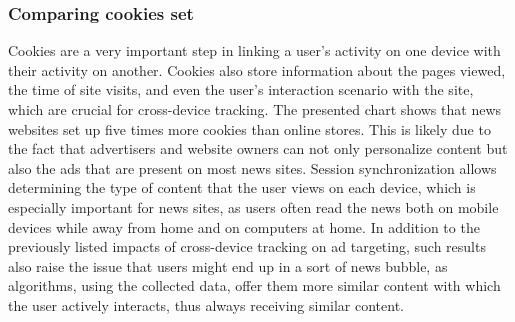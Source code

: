 \subsubsection{Comparing cookies set}
Cookies are a very important step in linking a user's activity on one device with their activity on another. Cookies also store information about the pages viewed, the time of site visits, and even the user's interaction scenario with the site, which are crucial for cross-device tracking. The presented chart shows that news websites set up five times more cookies than online stores. This is likely due to the fact that advertisers and website owners can not only personalize content but also the ads that are present on most news sites. Session synchronization allows determining the type of content that the user views on each device, which is especially important for news sites, as users often read the news both on mobile devices while away from home and on computers at home. In addition to the previously listed impacts of cross-device tracking on ad targeting, such results also raise the issue that users might end up in a sort of news bubble, as algorithms, using the collected data, offer them more similar content with which the user actively interacts, thus always receiving similar content.


